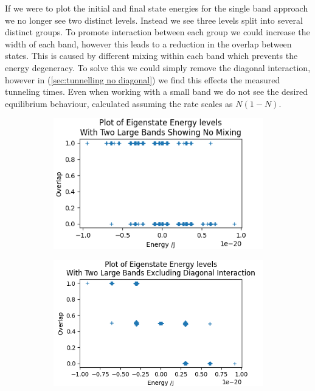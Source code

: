 If we were to plot the initial and final
state energies for the single band approach
we no longer see two distinct levels. Instead
we see three levels split into
several distinct groups.
To promote interaction between each group
we could increase the width of each band,
however this leads to a reduction in
the overlap between states. This is
caused by different mixing
within each band which prevents
the energy degeneracy. To solve this
we could simply remove the diagonal
interaction, however in (\cref{sec:tunnelling no diagonal})
we find this effects the
measured tunneling times.
Even when
working with a small band
we do not see the desired equilibrium
behaviour, calculated assuming the rate
scales as \(N(1-N)\).
\begin{figure}[htbp]
    \centering
    \begin{subfigure}{0.45\linewidth}
        \includegraphics[width=0.9\linewidth]{Figures/Simulation/Two Large Bands No Mixing.png}
        \label{fig:two band minimum mixing}
    \end{subfigure}
    \hfill
    \begin{subfigure}{0.45\linewidth}
        \includegraphics[width=0.9\linewidth]{Figures/Simulation/Two Large Bands No Diagonal.png}

\end{subfigure}
\end{figure}
